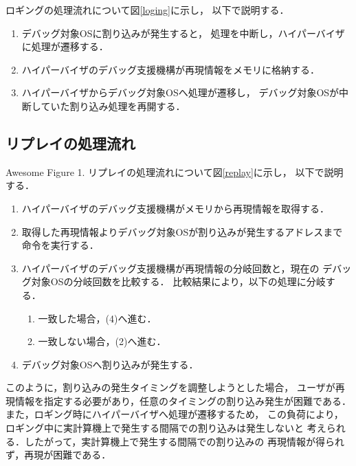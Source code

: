 \documentclass[tanilab-enum]{graduate}
\begin{document}
ロギングの処理流れについて図\ref{loging}に示し，
以下で説明する．
\begin{enumerate}
    \item 
        デバッグ対象OSに割り込みが発生すると，
        処理を中断し，ハイパーバイザに処理が遷移する．
    \item 
        ハイパーバイザのデバッグ支援機構が再現情報をメモリに格納する．
    \item 
        ハイパーバイザからデバッグ対象OSへ処理が遷移し，
        デバッグ対象OSが中断していた割り込み処理を再開する．
\end{enumerate}
\subsection{リプレイの処理流れ}
{Awesome Figure 1.} 
リプレイの処理流れについて図\ref{replay}に示し，
以下で説明する．
\begin{enumerate}
    \item 
        ハイパーバイザのデバッグ支援機構がメモリから再現情報を取得する．
    \item 
        取得した再現情報よりデバッグ対象OSが割り込みが発生するアドレスまで
        命令を実行する．
    \item 
        ハイパーバイザのデバッグ支援機構が再現情報の分岐回数と，現在の
        デバッグ対象OSの分岐回数を比較する．
        比較結果により，以下の処理に分岐する．
        \begin{enumerate}
            \item 一致した場合，(4)へ進む．
            \item 一致しない場合，(2)へ進む．
        \end{enumerate}
    \item 
        デバッグ対象OSへ割り込みが発生する．
\end{enumerate}
    
このように，割り込みの発生タイミングを調整しようとした場合，
ユーザが再現情報を指定する必要があり，任意のタイミングの割り込み発生が困難である．
また，ロギング時にハイパーバイザへ処理が遷移するため，
この負荷により，ロギング中に実計算機上で発生する間隔での割り込みは発生しないと
考えられる．したがって，実計算機上で発生する間隔での割り込みの
再現情報が得られず，再現が困難である．
\end{document}
